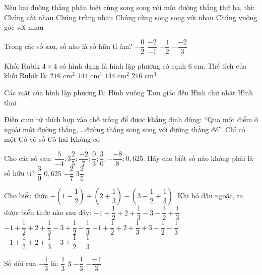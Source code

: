 \documentclass[12pt,a4paper]{article}
\begin{document}
\begin{ex}
Nếu hai đường thẳng phân biệt cùng song song với một đường thẳng thứ ba, thì:
\choice
{Chúng cắt nhau}
{Chúng trùng nhau}
{\True Chúng cũng song song với nhau}
{Chúng vuông góc với nhau}
\end{ex}

\begin{ex}
Trong các số sau, số nào là số hữu tỉ âm?
\choice
{$-\dfrac{0}{2}$}
{$\dfrac{-2}{-1}$}
{\True $-\dfrac{1}{2}$}
{$-\dfrac{-2}{3}$}
\end{ex}

\begin{ex}
Khối Rubik $4 \times 4$ có hình dạng là hình lập phương có cạnh $6\text{ cm}$. Thể tích của khối Rubik là:
\choice
{$216\text{ cm}^2$}
{$144\text{ cm}^3$}
{$144\text{ cm}^2$}
{\True $216\text{ cm}^3$}
\end{ex}

\begin{ex}
Các mặt của hình lập phương là:
\choice
{\True Hình vuông}
{Tam giác đều}
{Hình chữ nhật}
{Hình thoi}
\end{ex}

\begin{ex}
Điền cụm từ thích hợp vào chỗ trống để được khẳng định đúng: “Qua một điểm ở ngoài một đường thẳng, \dots đường thẳng song song với đường thẳng đó”.
\choice
{\True Chỉ có một}
{Có vô số}
{Có hai}
{Không có}
\end{ex}

\begin{ex}
Cho các số sau: $\dfrac{5}{-4}; 3\dfrac{2}{5}; \dfrac{-2}{7}; \dfrac{0}{3}; \dfrac{3}{0}; -\dfrac{-8}{8}; 0{,}625$. Hãy cho biết số nào không phải là số hữu tỉ?
\choice
{\True $\dfrac{3}{0}$}
{$0{,}625$}
{$-\dfrac{2}{7}$}
{$3\dfrac{2}{5}$}
\end{ex}

\begin{ex}
Cho biểu thức $-\left(1-\dfrac{1}{2}\right)+\left(2+\dfrac{1}{3}\right)-\left(3-\dfrac{1}{2}+\dfrac{1}{3}\right)$. Khi bỏ dấu ngoặc, ta được biểu thức nào sau đây:
\choice
{$-1+\dfrac{1}{2}+2+\dfrac{1}{3}-3-\dfrac{1}{2}+\dfrac{1}{3}$}
{\True $-1+\dfrac{1}{2}+2+\dfrac{1}{3}-3+\dfrac{1}{2}-\dfrac{1}{3}$}
{$-1+\dfrac{1}{2}+2+\dfrac{1}{3}+3-\dfrac{1}{2}-\dfrac{1}{3}$}
{$-1+\dfrac{1}{2}+2+\dfrac{1}{3}-3+\dfrac{1}{2}-\dfrac{1}{3}$}
\end{ex}

\begin{ex}
Số đối của $-\dfrac{1}{3}$ là:
\choice
{\True $\dfrac{1}{3}$}
{$3$}
{$-\dfrac{1}{3}$}
{$-\dfrac{-1}{3}$}
\end{ex}
\end{document}
